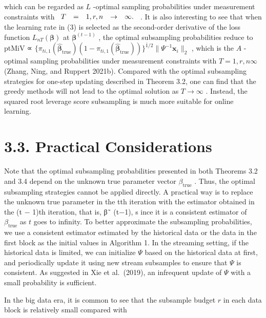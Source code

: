 \documentclass[
  10
]{article}
\begin{document}
which can be regarded as \(L\) -optimal sampling probabilities under
measurement constraints with
\(\begin{array} { c c c c c } { T } & { = } & { 1 , r , n } & { \to } & { \infty . } \end{array}\)
. It is also interesting to see that when the learning rate in (3) is
selected as the second-order derivative of the loss function
\(L _ { n T } ( \pmb { \beta } )\) at \(\pmb { \beta } ^ { ( t - 1 ) }\)
, the optimal subsampling probabilities reduce to ptMiV ∝
\(\{ \pi _ { t i , 1 } ( \widehat { \pmb { \beta } } _ { \mathrm { t r u e } } ) ( 1 - \pi _ { t i , 1 } ( \widehat { \pmb { \beta } } _ { \mathrm { t r u e } } ) ) \} ^ { \bar { 1 } / 2 } \| \Psi ^ { - 1 } \pmb { x } _ { i } \| _ { 2 }\)
, which is the \(A\) -optimal sampling probabilities under measurement
constraints with \(T = 1 , r , n  \infty\) (Zhang, Ning, and Ruppert
2021b). Compared with the optimal subsampling strategies for one-step
updating described in Theorem 3.2, one can find that the greedy methods
will not lead to the optimal solution as \(T \to \infty\) . Instead, the
squared root leverage score subsampling is much more suitable for online
learning.

\section{3.3. Practical Considerations}\label{practical-considerations}

Note that the optimal subsampling probabilities presented in both
Theorems 3.2 and 3.4 depend on the unknown true parameter vector
\(\beta _ { \mathrm { t r u e } }\) . Thus, the optimal subsampling
strategies cannot be applied directly. A practical way is to replace the
unknown true parameter in the tth iteration with the estimator obtained
in the (t − 1)th iteration, that is, β˜ (t−1), s ince it is a consistent
estimator of \(\beta _ { \mathrm { { t r u e } } }\) as \(t\) goes to
infinity. To better approximate the subsampling probabilities, we use a
consistent estimator estimated by the historical data or the data in the
first block as the initial values in Algorithm 1. In the streaming
setting, if the historical data is limited, we can initialize \(\Psi\)
based on the historical data at first, and periodically update it using
new stream subsamples to ensure that \(\Psi\) is consistent. As
suggested in Xie et al.~(2019), an infrequent update of \(\Psi\) with a
small probability is sufficient.

In the big data era, it is common to see that the subsample budget \(r\)
in each data block is relatively small compared with
\end{document}
